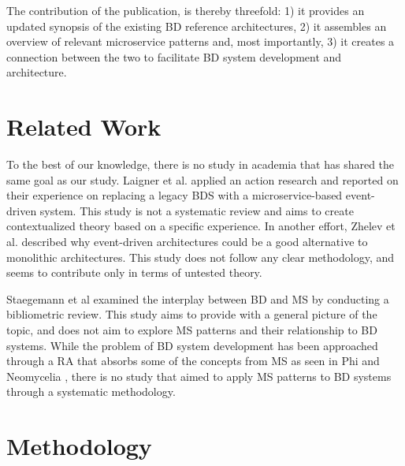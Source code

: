 \documentclass[a4paper,11pt,article,oneside]{memoir}
\begin{document}

The contribution of the publication, is thereby threefold: 1) it provides an updated synopsis of the existing BD reference architectures, 2) it assembles an overview of relevant microservice patterns and, most importantly, 3) it creates a connection between the two to facilitate BD system development and architecture.


\chapter{Related Work}

To the best of our knowledge, there is no study in academia that has shared the same goal as our study. Laigner et al. \cite{laigner2020monolithic} applied an action research and reported on their experience on replacing a legacy BDS with a microservice-based event-driven system. This study is not a systematic review and aims to create contextualized theory based on a specific experience. In another effort,  Zhelev et al. \cite{zhelev2019using} described why event-driven architectures could be a good alternative to monolithic architectures. This study does not follow any clear methodology, and seems to contribute only in terms of untested theory.

Staegemann et al \cite{staegemann2021examining} examined the interplay between BD and MS by conducting a bibliometric review. This study aims to provide with a general picture of the topic, and does not aim to explore MS patterns and their relationship to BD systems.  While the problem of BD system development has been approached through a RA that absorbs some of the concepts from MS as seen in Phi \cite{Phi} and Neomycelia \cite{ataei2021neomycelia}, there is no study that aimed to apply MS patterns to BD systems through a systematic methodology.


\chapter{Methodology}
\end{document}
